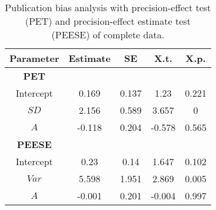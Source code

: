 \begin{table}[ht]
\centering
\caption{Publication bias analysis with precision-effect test (PET) and precision-effect estimate test (PEESE) of complete data.} 
\label{tab:PET-PEESE}
\begin{tabular}{ccccc}
  \hline
Parameter & Estimate & SE & X.t. & X.p. \\ 
  \hline
\textbf{PET} &  &  &  &  \\ 
  Intercept & 0.169 & 0.137 & 1.23 & 0.221 \\ 
  $SD$ & 2.156 & 0.589 & 3.657 & 0 \\ 
  $A$ & -0.118 & 0.204 & -0.578 & 0.565 \\ 
  \textbf{PEESE} &  &  &  &  \\ 
  Intercept & 0.23 & 0.14 & 1.647 & 0.102 \\ 
  $Var$ & 5.598 & 1.951 & 2.869 & 0.005 \\ 
  $A$ & -0.001 & 0.201 & -0.004 & 0.997 \\ 
   \hline
\end{tabular}
\end{table}
